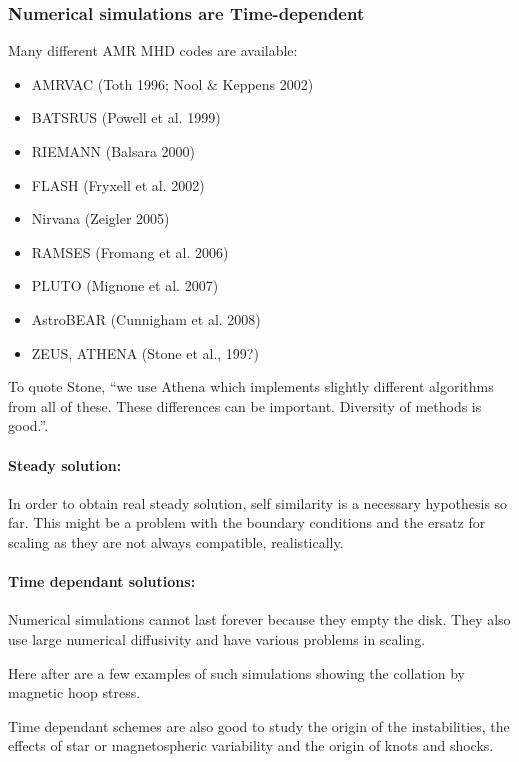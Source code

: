 \documentclass[10pt,a4paper,english]{article}
\begin{document}
\subsubsection{Numerical simulations are Time-dependent}
Many different AMR MHD codes are available:
\begin{itemize}
    \item AMRVAC (Toth 1996; Nool \& Keppens 2002)
    \item BATSRUS (Powell et al. 1999)
    \item RIEMANN (Balsara 2000)
    \item FLASH (Fryxell et al. 2002)
    \item Nirvana (Zeigler 2005)
    \item RAMSES (Fromang et al. 2006)
    \item PLUTO (Mignone et al. 2007)
    \item AstroBEAR (Cunnigham et al. 2008)
    \item ZEUS, ATHENA (Stone et al., 199?)
\end{itemize}
To quote Stone, ``we use Athena which implements slightly different algorithms from all of these. These differences can be important. Diversity of methods is good.''.

\paragraph{Steady solution:}

In order to obtain real steady solution, self similarity is a necessary hypothesis so far. This might be a problem with the boundary conditions and the ersatz for scaling as they are not always compatible, realistically.

\paragraph{Time dependant solutions:}

Numerical simulations cannot last forever because they empty the disk. They also use large numerical diffusivity and have various problems in scaling.

Here after are a few examples of such simulations showing the collation by magnetic hoop stress.

Time dependant schemes are also good to study the origin of the instabilities, the effects of star or magnetospheric variability and the origin of knots and shocks.

\end{document}
